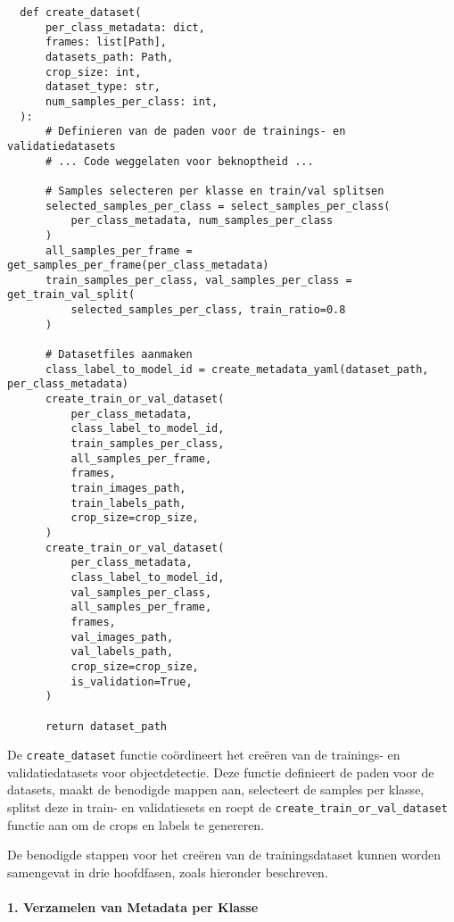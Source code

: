 \begin{listing}[H]
  \fontsize{10pt}{9.6pt}
  \begin{verbatim}
  def create_dataset(
      per_class_metadata: dict,
      frames: list[Path],
      datasets_path: Path,
      crop_size: int,
      dataset_type: str,
      num_samples_per_class: int,
  ):
      # Definieren van de paden voor de trainings- en validatiedatasets
      # ... Code weggelaten voor beknoptheid ...

      # Samples selecteren per klasse en train/val splitsen
      selected_samples_per_class = select_samples_per_class(
          per_class_metadata, num_samples_per_class
      )
      all_samples_per_frame = get_samples_per_frame(per_class_metadata)
      train_samples_per_class, val_samples_per_class = get_train_val_split(
          selected_samples_per_class, train_ratio=0.8
      )

      # Datasetfiles aanmaken
      class_label_to_model_id = create_metadata_yaml(dataset_path, per_class_metadata)
      create_train_or_val_dataset(
          per_class_metadata,
          class_label_to_model_id,
          train_samples_per_class,
          all_samples_per_frame,
          frames,
          train_images_path,
          train_labels_path,
          crop_size=crop_size,
      )
      create_train_or_val_dataset(
          per_class_metadata,
          class_label_to_model_id,
          val_samples_per_class,
          all_samples_per_frame,
          frames,
          val_images_path,
          val_labels_path,
          crop_size=crop_size,
          is_validation=True,
      )

      return dataset_path
  \end{verbatim}
  \caption[Functie voor het creëren van de objectdetectie-trainingsdataset]{
    \label{listing:create-dataset-overview}
    De \texttt{create\_dataset} functie coördineert het creëren van de trainings- en validatiedatasets voor objectdetectie.
    Deze functie definieert de paden voor de datasets, maakt de benodigde mappen aan,
    selecteert de samples per klasse, splitst deze in train- en validatiesets
    en roept de \texttt{create\_train\_or\_val\_dataset} functie aan om de crops en labels te genereren. 
  }
\end{listing}

De benodigde stappen voor het creëren van de trainingsdataset kunnen worden samengevat in drie hoofdfasen, zoals hieronder beschreven.

\paragraph{1. Verzamelen van Metadata per Klasse}


